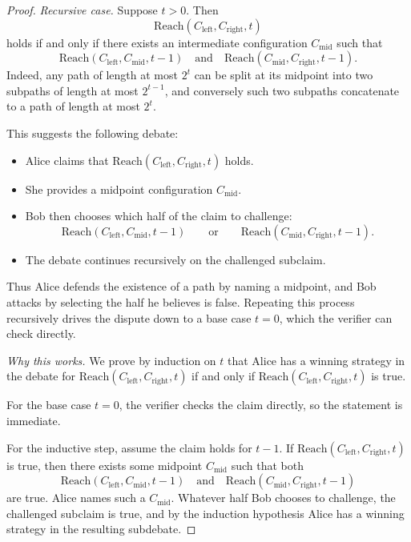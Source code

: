 \documentclass[11pt]{article}
\begin{document}
\begin{proof}
\medskip

\noindent\emph{Recursive case.}
Suppose \(t>0\). Then
\[
\mathrm{Reach}(C_{\mathrm{left}},C_{\mathrm{right}},t)
\]
holds if and only if there exists an intermediate configuration \(C_{\mathrm{mid}}\) such that
\[
\mathrm{Reach}(C_{\mathrm{left}},C_{\mathrm{mid}},t-1)
\quad\text{and}\quad
\mathrm{Reach}(C_{\mathrm{mid}},C_{\mathrm{right}},t-1).
\]
Indeed, any path of length at most \(2^t\) can be split at its midpoint into two subpaths of length at most \(2^{t-1}\), and conversely such two subpaths concatenate to a path of length at most \(2^t\).

This suggests the following debate:

\begin{itemize}
    \item Alice claims that \(\mathrm{Reach}(C_{\mathrm{left}},C_{\mathrm{right}},t)\) holds.
    \item She provides a midpoint configuration \(C_{\mathrm{mid}}\).
    \item Bob then chooses which half of the claim to challenge:
    \[
    \mathrm{Reach}(C_{\mathrm{left}},C_{\mathrm{mid}},t-1)
    \qquad\text{or}\qquad
    \mathrm{Reach}(C_{\mathrm{mid}},C_{\mathrm{right}},t-1).
    \]
    \item The debate continues recursively on the challenged subclaim.
\end{itemize}

Thus Alice defends the existence of a path by naming a midpoint, and Bob attacks by selecting the half he believes is false. Repeating this process recursively drives the dispute down to a base case \(t=0\), which the verifier can check directly.

\medskip

\noindent\emph{Why this works.}
We prove by induction on \(t\) that Alice has a winning strategy in the debate for \(\mathrm{Reach}(C_{\mathrm{left}},C_{\mathrm{right}},t)\) if and only if \(\mathrm{Reach}(C_{\mathrm{left}},C_{\mathrm{right}},t)\) is true.

For the base case \(t=0\), the verifier checks the claim directly, so the statement is immediate.

For the inductive step, assume the claim holds for \(t-1\). If \(\mathrm{Reach}(C_{\mathrm{left}},C_{\mathrm{right}},t)\) is true, then there exists some midpoint \(C_{\mathrm{mid}}\) such that both
\[
\mathrm{Reach}(C_{\mathrm{left}},C_{\mathrm{mid}},t-1)
\quad\text{and}\quad
\mathrm{Reach}(C_{\mathrm{mid}},C_{\mathrm{right}},t-1)
\]
are true. Alice names such a \(C_{\mathrm{mid}}\). Whatever half Bob chooses to challenge, the challenged subclaim is true, and by the induction hypothesis Alice has a winning strategy in the resulting subdebate.


\end{proof}
\end{document}

